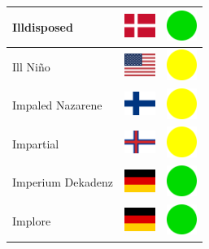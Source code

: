 \documentclass[12pt, a4paper, twoside]{report}
\begin{document}
\begin{center}
\begin{longtable}{|p{5cm}|p{2cm}|p{2cm}|}
			Illdisposed & \includegraphics[width=1cm]{4x3/dk} & \includegraphics[width=1cm]{likes/y} \\ \hline
			Ill Niño & \includegraphics[width=1cm]{4x3/us} & \includegraphics[width=1cm]{likes/m} \\ \hline
			Impaled Nazarene & \includegraphics[width=1cm]{4x3/fi} & \includegraphics[width=1cm]{likes/m} \\ \hline
			Impartial & \includegraphics[width=1cm]{4x3/fo} & \includegraphics[width=1cm]{likes/m} \\ \hline
			Imperium Dekadenz & \includegraphics[width=1cm]{4x3/de} & \includegraphics[width=1cm]{likes/y} \\ \hline
			Implore & \includegraphics[width=1cm]{4x3/de} & \includegraphics[width=1cm]{likes/y} \\ \hline

\end{longtable}
\end{center}
\end{document}
